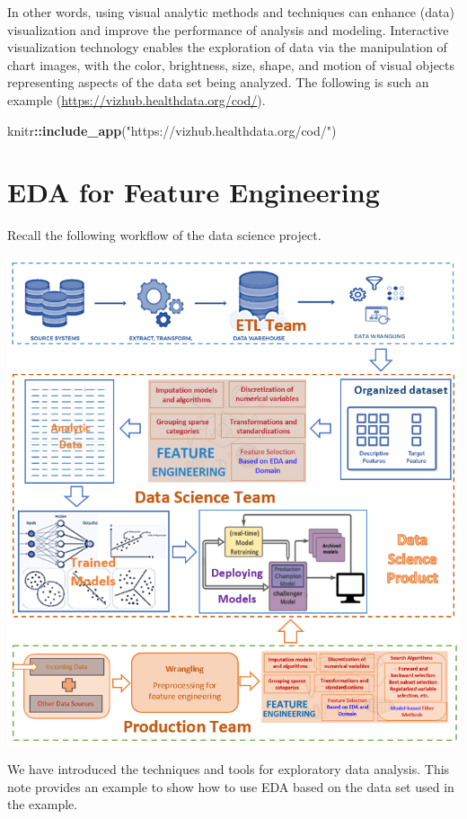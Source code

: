\documentclass[
]{book}
\newenvironment{Shaded}{\begin{snugshade}}{\end{snugshade}}
\newcommand{\FunctionTok}[1]{\textcolor[rgb]{0.13,0.29,0.53}{\textbf{#1}}}
\newcommand{\NormalTok}[1]{#1}
\newcommand{\SpecialCharTok}[1]{\textcolor[rgb]{0.81,0.36,0.00}{\textbf{#1}}}
\newcommand{\StringTok}[1]{\textcolor[rgb]{0.31,0.60,0.02}{#1}}
\begin{document}
In other words, using visual analytic methods and techniques can enhance (data) visualization and improve the performance of analysis and modeling. Interactive visualization technology enables the exploration of data via the manipulation of chart images, with the color, brightness, size, shape, and motion of visual objects representing aspects of the data set being analyzed. The following is such an example (\url{https://vizhub.healthdata.org/cod/}).

\begin{Shaded}
\begin{Highlighting}[]
\NormalTok{knitr}\SpecialCharTok{::}\FunctionTok{include\_app}\NormalTok{(}\StringTok{"https://vizhub.healthdata.org/cod/"}\NormalTok{)}
\end{Highlighting}
\end{Shaded}

\hypertarget{eda-for-feature-engineering}{%
\chapter{EDA for Feature Engineering}\label{eda-for-feature-engineering}}

Recall the following workflow of the data science project.

\begin{center}\includegraphics[width=0.8\linewidth]{img03/DS-project-workflow} \end{center}

We have introduced the techniques and tools for exploratory data analysis. This note provides an example to show how to use EDA based on the data set used in the example.
\end{document}
